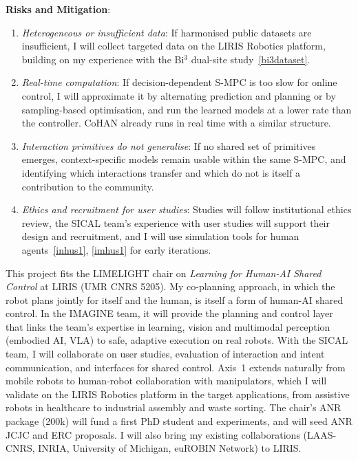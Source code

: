 \documentclass[11pt]{article}
\newcommand{\boldheading}[1]{\par\vspace{4pt}{\bfseries #1\par}\vspace{2pt}}
\begin{document}
\vspace{1ex}
\noindent \textbf{{Risks and Mitigation}}:
\begin{enumerate}[leftmargin=*,topsep=0pt,itemsep=0pt,parsep=0pt]
\item \textit{Heterogeneous or insufficient data}: If harmonised public datasets are insufficient, I will collect targeted data on the LIRIS Robotics platform, building on my experience with the Bi$^3$ dual-site study~\ref{bi3dataset}.
\item \textit{Real-time computation}: If decision-dependent S-MPC is too slow for online control, I will approximate it by alternating prediction and planning or by sampling-based optimisation, and run the learned models at a lower rate than the controller. CoHAN already runs in real time with a similar structure.
\item \textit{Interaction primitives do not generalise}: If no shared set of primitives emerges, context-specific models remain usable within the same S-MPC, and identifying which interactions transfer and which do not is itself a contribution to the community.
\item \textit{Ethics and recruitment for user studies}: Studies will follow institutional ethics review, the SICAL team's experience with user studies will support their design and recruitment, and I will use simulation tools for human agents~\ref{inhus1}, \ref{imhus1} for early iterations.
\end{enumerate}

\newpage
\boldheading{{Integration in the Host Team}} This project fits the LIMELIGHT chair on \textit{Learning for Human-AI Shared Control} at LIRIS (UMR CNRS 5205). My co-planning approach, in which the robot plans jointly for itself and the human, is itself a form of human-AI shared control. In the IMAGINE team, it will provide the planning and control layer that links the team's expertise in learning, vision and multimodal perception (embodied AI, VLA) to safe, adaptive execution on real robots. With the SICAL team, I will collaborate on user studies, evaluation of interaction and intent communication, and interfaces for shared control. Axis~1 extends naturally from mobile robots to human-robot collaboration with manipulators, which I will validate on the LIRIS Robotics platform in the target applications, from assistive robots in healthcare to industrial assembly and waste sorting. The chair's ANR package (\texteuro 200k) will fund a first PhD student and experiments, and will seed ANR JCJC and ERC proposals. I will also bring my existing collaborations (LAAS-CNRS, INRIA, University of Michigan, euROBIN Network) to LIRIS.
\end{document}
